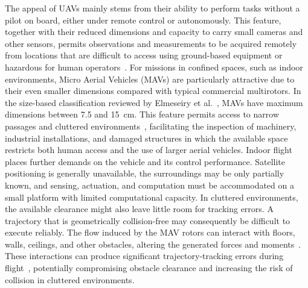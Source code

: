 \documentclass[journal]{IEEEtran}
\begin{document}
The appeal of UAVs mainly stems from their ability to perform tasks without a pilot on board, either under remote control or autonomously. This feature, together with their reduced dimensions and capacity to carry small cameras and other sensors, permits observations and measurements to be acquired remotely from locations that are difficult to access using ground-based equipment or hazardous for human operators~\cite{ZhangInspection2024}. 
For missions in confined spaces, such as indoor environments, Micro Aerial Vehicles (MAVs) are particularly attractive due to their even smaller dimensions compared with typical commercial multirotors. In the size-based classification reviewed by Elmeseiry et al.~\cite{Elmeseiry2021}, MAVs have maximum dimensions between 7.5 and 15~cm. This feature permits access to narrow passages and cluttered environments~\cite{Floreano2015,ZhouSwarm2022}, facilitating the inspection of machinery, industrial installations, and damaged structures in which the available space restricts both human access and the use of larger aerial vehicles. 
Indoor flight places further demands on the vehicle and its control performance. Satellite positioning is generally unavailable, the surroundings may be only partially known, and sensing, actuation, and computation must be accommodated on a small platform with limited computational capacity. In cluttered environments, the available clearance might also leave little room for tracking errors. A trajectory that is geometrically collision-free may consequently be difficult to execute reliably. 
The flow induced by the MAV rotors can interact with floors, walls, ceilings, and other obstacles, altering the generated forces and moments~\cite{Carter2021}. These interactions can produce significant trajectory-tracking errors during flight~\cite{NeuralLander2019}, potentially compromising obstacle clearance and increasing the risk of collision in cluttered environments.
\end{document}
